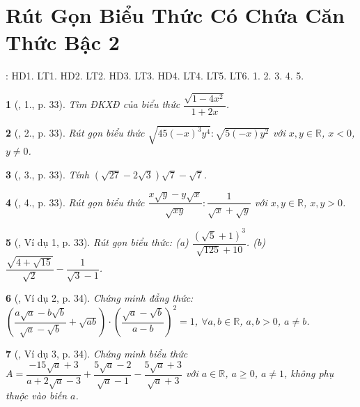 \documentclass{article}
\newtheorem{baitoan}{}
\begin{document}

\section{Rút Gọn Biểu Thức Có Chứa Căn Thức Bậc 2}
\cite[Chap. III, \S4, pp. 67--66]{SGK_Toan_9_Canh_Dieu_tap_1}: HD1. LT1. HD2. LT2. HD3. LT3. HD4. LT4. LT5. LT6. 1. 2. 3. 4. 5.

\begin{baitoan}[\cite{Binh_boi_duong_Toan_9_tap_1}, 1., p. 33]
	Tìm {\rm ĐKXĐ} của biểu thức $\dfrac{\sqrt{1 - 4x^2}}{1 + 2x}$.
\end{baitoan}

\begin{baitoan}[\cite{Binh_boi_duong_Toan_9_tap_1}, 2., p. 33]
	Rút gọn biểu thức $\sqrt{45(-x)^3y^4}:\sqrt{5(-x)y^2}$ với $x,y\in\mathbb{R}$, $x < 0$, $y\ne0$.
\end{baitoan}

\begin{baitoan}[\cite{Binh_boi_duong_Toan_9_tap_1}, 3., p. 33]
	Tính $(\sqrt{27} - 2\sqrt{3})\sqrt{7} - \sqrt{7}$.
\end{baitoan}

\begin{baitoan}[\cite{Binh_boi_duong_Toan_9_tap_1}, 4., p. 33]
	Rút gọn biểu thức $\dfrac{x\sqrt{y} - y\sqrt{x}}{\sqrt{xy}}:\dfrac{1}{\sqrt{x} + \sqrt{y}}$ với $x,y\in\mathbb{R}$, $x,y > 0$.
\end{baitoan}

\begin{baitoan}[\cite{Binh_boi_duong_Toan_9_tap_1}, Ví dụ 1, p. 33]
	Rút gọn biểu thức: (a) $\dfrac{(\sqrt{5} + 1)^3}{\sqrt{125} + 10}$. (b) $\dfrac{\sqrt{4 + \sqrt{15}}}{\sqrt{2}} - \dfrac{1}{\sqrt{3} - 1}$.
\end{baitoan}

\begin{baitoan}[\cite{Binh_boi_duong_Toan_9_tap_1}, Ví dụ 2, p. 34]
	Chứng minh đẳng thức: $\left(\dfrac{a\sqrt{a} - b\sqrt{b}}{\sqrt{a} - \sqrt{b}} + \sqrt{ab}\right)\cdot\left(\dfrac{\sqrt{a} - \sqrt{b}}{a - b}\right)^2 = 1$, $\forall a,b\in\mathbb{R}$, $a,b > 0$, $a\ne b$.
\end{baitoan}

\begin{baitoan}[\cite{Binh_boi_duong_Toan_9_tap_1}, Ví dụ 3, p. 34]
	Chứng minh biểu thức $A = \dfrac{-15\sqrt{a} + 3}{a + 2\sqrt{a} - 3} + \dfrac{5\sqrt{a} - 2}{\sqrt{a} - 1} - \dfrac{5\sqrt{a} + 3}{\sqrt{a} + 3}$ với $a\in\mathbb{R}$, $a\ge0$, $a\ne1$, không phụ thuộc vào biến $a$.
\end{baitoan}
\end{document}
